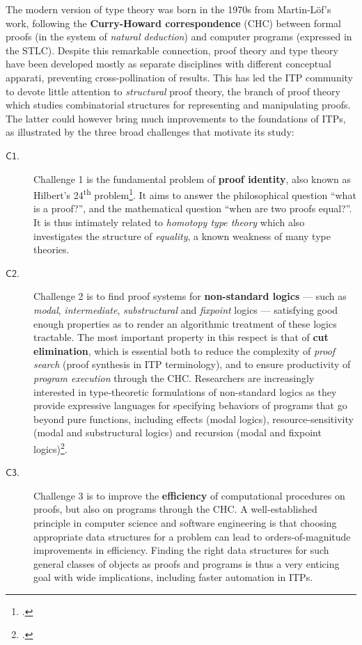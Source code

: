 \documentclass[12pt,draftproposal]{msca-pf}
\newcommand{\CH}[1]{$\mathsf{C#1}$}
\begin{document}
The modern version of type theory was born in the 1970s from Martin-Löf's work, following the
\textbf{Curry-Howard correspondence} (CHC) between formal proofs (in the system of \emph{natural
deduction}) and computer programs (expressed in the STLC). Despite this remarkable connection, proof
theory and type theory have been developed mostly as separate disciplines with different conceptual
apparati, preventing cross-pollination of results. This has led the ITP community to devote little
attention to \emph{structural} proof theory, the branch of proof theory which studies combinatorial
structures for representing and manipulating proofs. The latter could however bring much
improvements to the foundations of ITPs, as illustrated by the three broad challenges that motivate
its study:
\begin{description}
    \item[\CH{1}.] Challenge 1 is the fundamental problem of \textbf{proof identity}, also
    known as Hilbert's 24\textsuperscript{th} problem\footcite{strasburger-problem-2019}. It aims to
    answer the philosophical question ``what is a proof?'', and the mathematical question ``when are
    two proofs equal?''. It is thus intimately related to \emph{homotopy type theory} which also
    investigates the structure of \emph{equality}, a known weakness of many type theories.

    \item[\CH{2}.] Challenge 2 is to find proof systems for \textbf{non-standard logics} --- such as
    \emph{modal}, \emph{intermediate}, \emph{substructural} and \emph{fixpoint} logics ---
    satisfying good enough properties as to render an algorithmic treatment of these logics
    tractable. The most important property in this respect is that of \textbf{cut elimination},
    which is essential both to reduce the complexity of \emph{proof search} (proof synthesis in ITP
    terminology), and to ensure productivity of \emph{program execution} through the CHC.
    Researchers are increasingly interested in type-theoretic formulations of non-standard logics as
    they provide expressive languages for specifying behaviors of programs that go beyond pure
    functions, including effects (modal logics), resource-sensitivity (modal and substructural
    logics) and recursion (modal and fixpoint
    logics)\footcite{tangModalEffectTypes2025,marshallLinearityUniquenessEntente2022,cloustonGuardedLambdaCalculusProgramming2017}.
    
    \item[\CH{3}.] Challenge 3 is to improve the \textbf{efficiency} of computational
    procedures on proofs, but also on programs through the CHC. A well-established principle in
    computer science and software engineering is that choosing appropriate data structures for a
    problem can lead to orders-of-magnitude improvements in efficiency. Finding the right data
    structures for such general classes of objects as proofs and programs is thus a very enticing
    goal with wide implications, including faster automation in ITPs.
\end{description}
\end{document}
